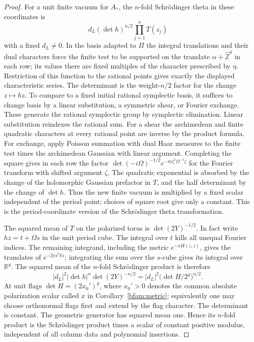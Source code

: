\begin{proof}
For a unit finite vacuum for \(A_*\), the \(n\)-fold Schrödinger
theta in these coordinates is
\[
       d_L(\det h)^{n/2}\prod_{j=1}^n T(z_j)
\]
with a fixed \(d_L\ne0\). In the basis adapted to \(\Pi\) the
integral translations and their dual characters force the finite
test to be supported on the translate
\(\alpha+\widehat{\mathbb Z}^{g}\) in each row; its values there
are fixed multiples of the character prescribed by \(\eta\).
Restriction of this function to the rational points gives exactly
the displayed characteristic series. The determinant is the
weight-\(n/2\) factor for the change \(z\mapsto hz\).
To compare to a fixed initial rational symplectic basis, it suffices
to change basis by a linear substitution, a symmetric shear, or
Fourier exchange. These generate the rational symplectic group by
symplectic elimination. Linear substitution reindexes the rational
sum. For a shear the archimedean and finite quadratic characters
at every rational point are inverse by the product formula. For
exchange, apply Poisson summation with dual Haar measures to the
finite test times the archimedean Gaussian with linear argument.
Completing the square gives in each row the factor
\(\det(-i\Omega)^{-1/2}
e^{-\pi i\zeta^t\Omega^{-1}\zeta}\) for the Fourier transform
with shifted argument \(\zeta\). The quadratic exponential is
absorbed by the change of the holomorphic Gaussian prefactor in
\(T\), and the half determinant by the change of \(\det h\).
Thus the new finite vacuum is multiplied by a fixed scalar
independent of the period point; choices of square root give
only a constant. This is the period-coordinate version of the
Schrödinger theta transformation.

The squared mean of \(T\) on the polarized torus is
\(\det(2Y)^{-1/2}\). In fact write \(hz=t+\Omega s\) in
the unit period cube. The integral over \(t\) kills all unequal
Fourier indices. The remaining integrand, including the metric
\(e^{-\pi H(z,z)}\), gives the translates of
\(e^{-2\pi s^t Y s}\); integrating the sum over the \(s\)-cube
gives its integral over \(\mathbb R^g\).
The squared mean of the \(n\)-fold Schrödinger product is
therefore
\[
    |d_L|^2|\det h|^n\det(2Y)^{-n/2}
      = |d_L|^2\bigl(\det H/2^g\bigr)^{n/2}.
\]
At unit flags \(\det H=(2x_0')^g\), where \(x_0'>0\) denotes
the common absolute polarization scalar called \(x\) in
Corollary~\ref{bfam:metric}; equivalently one may choose
orthonormal flags first and extend by the flag character.
The determinant is constant. The geometric generator has squared
mean one. Hence its \(n\)-fold product is the Schrödinger product
times a scalar of constant positive modulus, independent of all
column data and polynomial insertions.


\end{proof}
